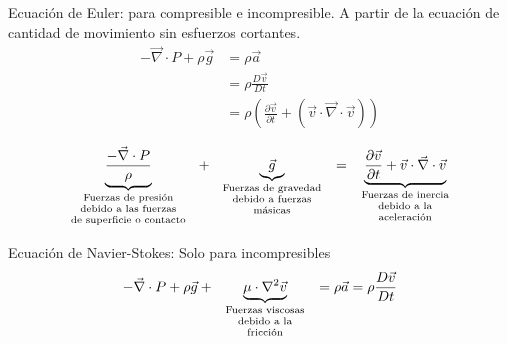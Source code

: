 Ecuación de Euler: para compresible e incompresible. A partir de la ecuación de cantidad de movimiento sin esfuerzos cortantes. 
\[
    \begin{split}
        -\vec{ \nabla } \cdot P + \rho \vec{g} & = \rho \vec{a} \\
        & = \rho \frac{ D \vec{v} }{ Dt } \\
        & = \rho ( \frac{ \partial \vec{v} }{ \partial t } + ( \vec{v} \cdot \vec{ \nabla } \cdot \vec{v}) )
    \end{split}
\]

\[
    \underbrace{ \frac{ -\vec{ \nabla } \cdot P }{ \rho }}_{ 
        \begin{scriptsize}
            \begin{array}{cc}
                \text{ Fuerzas de presión } \\
                \text{ debido a las fuerzas } \\
                \text{ de superficie o contacto }
            \end{array}
        \end{scriptsize} } + 
    \underbrace{ \vec{g}}_{ 
        \begin{scriptsize}
            \begin{array}{cc}
                \text{ Fuerzas de gravedad } \\
                \text{ debido a fuerzas } \\
                \text{ másicas }
            \end{array} 
        \end{scriptsize} } = 
    \underbrace{ \frac{ \partial \vec{v} }{ \partial t } + \vec{v} \cdot \vec{ \nabla } \cdot \vec{v}}_{ 
        \begin{scriptsize}
            \begin{array}{cc}
                \text{ Fuerzas de inercia } \\
                \text{ debido a la } \\
                \text{ aceleración }
            \end{array}
        \end{scriptsize} }
\]

Ecuación de Navier-Stokes: Solo para incompresibles
\[
    -\vec{ \nabla } \cdot P + \rho \vec{g} + 
    \underbrace{ \mu \cdot \nabla^{2} \vec{v} }_{
        \begin{scriptsize}
            \begin{array}{cc}
                \text{ Fuerzas viscosas } \\
                \text{ debido a la } \\
                \text{ fricción }
            \end{array}
        \end{scriptsize} } = \rho \vec{a} = \rho \frac{ D \vec{v} }{ Dt }
\] 

